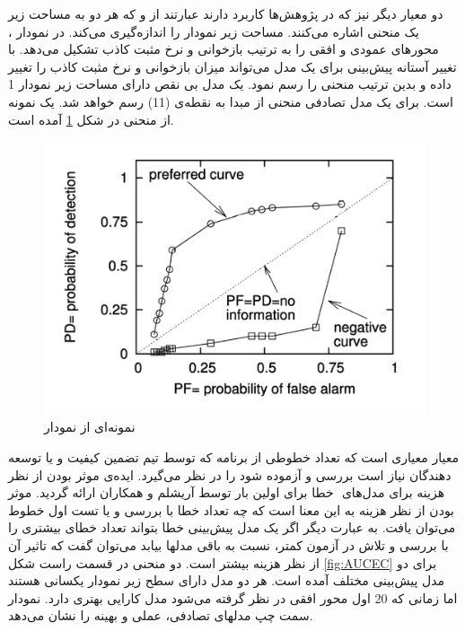 دو معیار دیگر نیز که در پژوهش‌ها کاربرد دارند عبارتند از 
  و 
که هر دو به مساحت زیر یک منحنی اشاره می‌کنند.   مساحت زیر نمودار
را اندازه‌گیری می‌کند. در نمودار ،  محورهای عمودی و افقی را به ترتیب بازخوانی و  نرخ مثبت کاذب تشکیل می‌دهد.  با تغییر آستانه پیش‌بینی برای یک مدل می‌تواند میزان بازخوانی و  نرخ مثبت کاذب را تغییر داده و بدین ترتیب منحنی  را رسم نمود. یک مدل بی نقص دارای مساحت زیر نمودار 1 است. برای یک مدل تصادفی  منحنی از مبدا به نقطه‌ی (1\lr{,}1) رسم خواهد شد. یک نمونه از منحنی  در شکل \ref{fig:ROC} آمده است. \\

\begin{figure}[H]
	\centering
	\includegraphics[width=.65\textwidth]{images/ROC.PNG}
	\caption{ نمونه‌ای از نمودار  \cite{menzies2007data}}
	\label{fig:ROC}
\end{figure}

معیار  معیاری است که تعداد خطوطی از برنامه که  توسط تیم تضمین کیفیت و یا توسعه دهندگان نیاز است بررسی و آزموده شود را در نظر می‌گیرد. ایده‌ی  موثر بودن از نظر هزینه
برای مدل‌های ‌‌ خطا برای اولین بار توسط آریشلم و همکاران \cite{arisholm2007data} ارائه گردید. موثر بودن از نظر هزینه به این معنا است که چه تعداد خطا با بررسی و یا تست   اول خطوط می‌توان یافت. به عبارت دیگر اگر یک مدل پیش‌بینی خطا بتواند تعداد خطای بیشتری را با بررسی و تلاش در آزمون کمتر، نسبت به باقی مدلها بیابد می‌توان گفت که تاثیر آن از نظر هزینه بیشتر است. دو منحنی در  قسمت راست شکل \ref{fig:AUCEC} برای دو مدل پیش‌بینی مختلف آمده است. هر دو مدل دارای سطح زیر نمودار یکسانی هستند اما زمانی که 20\lr{\%}  اول محور افقی در نظر گرفته می‌شود مدل 
  کارایی بهتری دارد. نمودار سمت چپ مدلهای تصادفی، عملی و بهینه را نشان می‌دهد.

